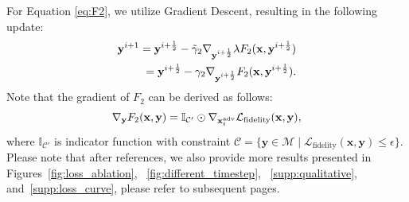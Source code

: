 For Equation \ref{eq:F2}, we utilize Gradient Descent, resulting in the following update:
\begin{align}
\mathbf{y}^{i+1} = \mathbf{y}^{i+\frac{1}{2}} - \Tilde{\gamma}_2 \nabla_{\mathbf{y}^{i+\frac{1}{2}}} \lambda F_2(\mathbf{x}, \mathbf{y}^{i+\frac{1}{2}}) \\
= \mathbf{y}^{i+\frac{1}{2}} - \gamma_2 \nabla_{\mathbf{y}^{i+\frac{1}{2}}} F_2(\mathbf{x}, \mathbf{y}^{i+\frac{1}{2}}).
\end{align}
Note that the gradient of $F_2$ can be derived as follows:
\begin{align*}
    \nabla_{\mathbf{y}} F_2(\mathbf{x}, \mathbf{y})
    = \mathbb{I}_\mathcal{C'} \odot
    \nabla_{\mathbf{x}^{\adv}_t} \mathcal{L}_\text{fidelity}(\mathbf{x}, \mathbf{y}),
\end{align*}
where $\mathbb{I}_\mathcal{C'}$ is indicator function with constraint $\mathcal{C} = {\{\mathbf{y} \in \mathcal{M} \mid \mathcal{L}_\text{fidelity}(\mathbf{x}, \mathbf{y}) \leq \epsilon\}}$.\\

Please note that after references, we also provide more results presented in Figures~\ref{fig:loss_ablation}, ~\ref{fig:different_timestep}, ~\ref{supp:qualitative}, and~\ref{supp:loss_curve}, please refer to subsequent pages.


